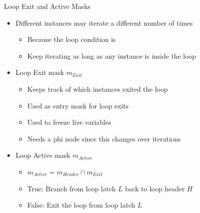 
\begin{frame}{Loop Exit and Active Masks}

\begin{minipage}[t]{0.70\linewidth}

\begin{itemize}
    \item Different instances may iterate a different number of times
    \begin{itemize}
        \item Because the loop condition is 
        \item Keep iterating as long as any instance is inside the loop
    \end{itemize}
    \item Loop Exit mask $m_{Exit}$
    \begin{itemize}
        \item Keeps track of which instances exited the loop
        \item Used as entry mask for loop exits
        \item Used to freeze live variables
        \item Needs a phi node since this changes over iterations
    \end{itemize}
    \item Loop Active mask $m_{Active}$
    \begin{itemize}
        \item $m_{Active} = m_{Header} \cap \overline{m_{Exit}}$
        \item True: Branch from loop latch $L$ back to loop header $H$
        \item False: Exit the loop from loop latch $L$
    \end{itemize}
\end{itemize}

\end{minipage}
\hspace{1em}
\begin{minipage}[t]{0.23\linewidth}

\vspace{0.1ex}


\end{minipage}
\end{frame}
